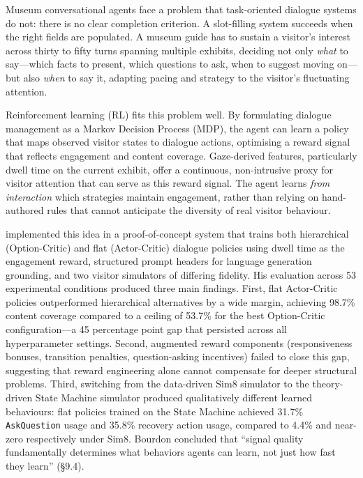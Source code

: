 \documentclass[a4paper, 11pt]{article}
\begin{document}
Museum conversational agents face a problem that task-oriented dialogue systems do not: there is no clear completion criterion. A slot-filling system succeeds when the right fields are populated. A museum guide has to sustain a visitor's interest across thirty to fifty turns spanning multiple exhibits, deciding not only \emph{what} to say---which facts to present, which questions to ask, when to suggest moving on---but also \emph{when} to say it, adapting pacing and strategy to the visitor's fluctuating attention.

Reinforcement learning (RL) fits this problem well. By formulating dialogue management as a Markov Decision Process (MDP), the agent can learn a policy that maps observed visitor states to dialogue actions, optimising a reward signal that reflects engagement and content coverage. Gaze-derived features, particularly dwell time on the current exhibit, offer a continuous, non-intrusive proxy for visitor attention that can serve as this reward signal. The agent learns \emph{from interaction} which strategies maintain engagement, rather than relying on hand-authored rules that cannot anticipate the diversity of real visitor behaviour.

\citet{bourdon2024thesis} implemented this idea in a proof-of-concept system that trains both hierarchical (Option-Critic) and flat (Actor-Critic) dialogue policies using dwell time as the engagement reward, structured prompt headers for language generation grounding, and two visitor simulators of differing fidelity. His evaluation across 53 experimental conditions produced three main findings. First, flat Actor-Critic policies outperformed hierarchical alternatives by a wide margin, achieving 98.7\% content coverage compared to a ceiling of 53.7\% for the best Option-Critic configuration---a 45 percentage point gap that persisted across all hyperparameter settings. Second, augmented reward components (responsiveness bonuses, transition penalties, question-asking incentives) failed to close this gap, suggesting that reward engineering alone cannot compensate for deeper structural problems. Third, switching from the data-driven Sim8 simulator to the theory-driven State Machine simulator produced qualitatively different learned behaviours: flat policies trained on the State Machine achieved 31.7\% \texttt{AskQuestion} usage and 35.8\% recovery action usage, compared to 4.4\% and near-zero respectively under Sim8. Bourdon concluded that ``signal quality fundamentally determines what behaviors agents can learn, not just how fast they learn'' (\S9.4).
\end{document}
